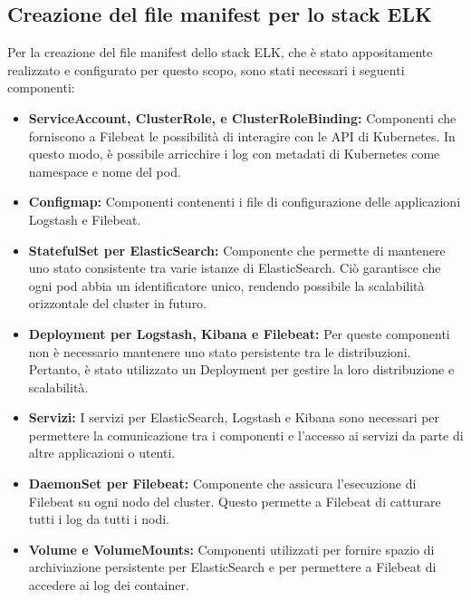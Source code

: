 \subsection{Creazione del file manifest per lo stack ELK}\label{reazione del file manifest per lo stack ELK}
Per la creazione del file manifest dello stack ELK, che è stato appositamente realizzato e configurato per questo scopo, sono stati necessari i seguenti componenti:
\begin{itemize}
\item \textbf{ServiceAccount, ClusterRole, e ClusterRoleBinding:} Componenti che forniscono a Filebeat le possibilità di interagire con le API di Kubernetes. In questo modo, è possibile arricchire i log con metadati di Kubernetes come namespace e nome del pod.

\item \textbf{Configmap:} Componenti contenenti i file di configurazione delle applicazioni Logstash e Filebeat.

\item \textbf{StatefulSet per ElasticSearch:} Componente che permette di mantenere uno stato consistente tra varie istanze di ElasticSearch. Ciò garantisce che ogni pod abbia un identificatore unico, rendendo possibile la scalabilità orizzontale del cluster in futuro.

\item \textbf{Deployment per Logstash, Kibana e Filebeat:} Per queste componenti non è necessario mantenere uno stato persistente tra le distribuzioni. Pertanto, è stato utilizzato un Deployment per gestire la loro distribuzione e scalabilità.

\item \textbf{Servizi:} I servizi per ElasticSearch, Logstash e Kibana sono necessari per permettere la comunicazione tra i componenti e l'accesso ai servizi da parte di altre applicazioni o utenti.

\item \textbf{DaemonSet per Filebeat:} Componente che assicura l'esecuzione di Filebeat su ogni nodo del cluster. Questo permette a Filebeat di catturare tutti i log da tutti i nodi.

\item \textbf{Volume e VolumeMounts:} Componenti utilizzati per fornire spazio di archiviazione persistente per ElasticSearch e per permettere a Filebeat di accedere ai log dei container.

\end{itemize}

